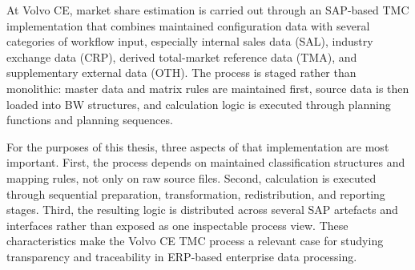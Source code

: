 






At Volvo CE, market share estimation is carried out through an SAP-based TMC implementation that combines maintained configuration data with several categories of workflow input, especially internal sales data (SAL), industry exchange data (CRP), derived total-market reference data (TMA), and supplementary external data (OTH). The process is staged rather than monolithic: master data and matrix rules are maintained first, source data is then loaded into BW structures, and calculation logic is executed through planning functions and planning sequences.

For the purposes of this thesis, three aspects of that implementation are most important. First, the process depends on maintained classification structures and mapping rules, not only on raw source files. Second, calculation is executed through sequential preparation, transformation, redistribution, and reporting stages. Third, the resulting logic is distributed across several SAP artefacts and interfaces rather than exposed as one inspectable process view. These characteristics make the Volvo CE TMC process a relevant case for studying transparency and traceability in ERP-based enterprise data processing.


